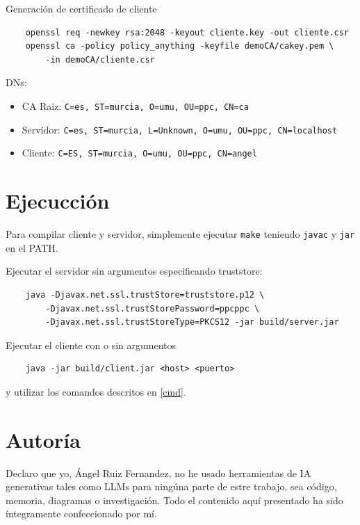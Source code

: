 \documentclass[12pt]{article}
\begin{document}
    Generación de certificado de cliente

    \begin{verbatim}
    openssl req -newkey rsa:2048 -keyout cliente.key -out cliente.csr
    openssl ca -policy policy_anything -keyfile demoCA/cakey.pem \
        -in demoCA/cliente.csr
    \end{verbatim}

    DNs:
    \begin{itemize}
        \item CA Raiz: \texttt{C=es, ST=murcia, O=umu, OU=ppc, CN=ca}
        \item Servidor: \texttt{C=es, ST=murcia, L=Unknown, O=umu, OU=ppc, CN=localhost}
        \item Cliente: \texttt{C=ES, ST=murcia, O=umu, OU=ppc, CN=angel}
    \end{itemize}

    \section{Ejecucción}

    Para compilar cliente y servidor, simplemente ejecutar \texttt{make} teniendo
    \texttt{javac} y \texttt{jar} en el PATH.

    Ejecutar el servidor sin argumentos especificando truststore:
    \begin{verbatim}
    java -Djavax.net.ssl.trustStore=truststore.p12 \
        -Djavax.net.ssl.trustStorePassword=ppcppc \
        -Djavax.net.ssl.trustStoreType=PKCS12 -jar build/server.jar
    \end{verbatim}

    Ejecutar el cliente con o sin argumentos
    \begin{verbatim}
    java -jar build/client.jar <host> <puerto>
    \end{verbatim}
    y utilizar los comandos descritos en \ref{cmd}.

    \section{Autoría}

    Declaro que yo, Ángel Ruiz Fernandez, no he usado herramientas de IA
    generativas tales como LLMs para ningúna parte de estre trabajo, sea código,
    memoria, diagramas o investigación. Todo el contenido aquí presentado ha sido
    íntegramente confeccionado por mí.
\end{document}
